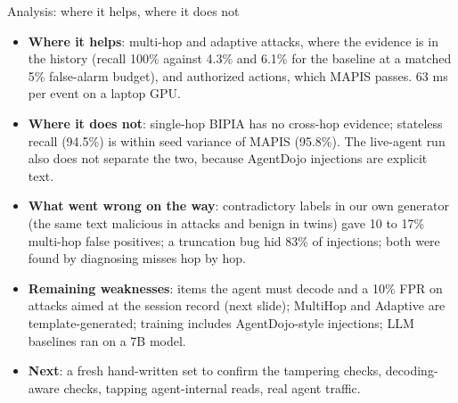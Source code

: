 \documentclass[aspectratio=169,10pt]{beamer}
\begin{document}
\begin{frame}{Analysis: where it helps, where it does not}
  \begin{itemize}\small
    \item \textbf{Where it helps}: multi-hop and adaptive attacks, where the evidence is in the history (recall 100\% against 4.3\% and 6.1\% for the baseline at a matched 5\% false-alarm budget), and authorized actions, which MAPIS passes. 63 ms per event on a laptop GPU.
    \item \textbf{Where it does not}: single-hop BIPIA has no cross-hop evidence; stateless recall (94.5\%) is within seed variance of MAPIS (95.8\%). The live-agent run also does not separate the two, because AgentDojo injections are explicit text.
    \item \textbf{What went wrong on the way}: contradictory labels in our own generator (the same text malicious in attacks and benign in twins) gave 10 to 17\% multi-hop false positives; a truncation bug hid 83\% of injections; both were found by diagnosing misses hop by hop.
    \item \textbf{Remaining weaknesses}: items the agent must decode and a 10\% FPR on attacks aimed at the session record (next slide); MultiHop and Adaptive are template-generated; training includes AgentDojo-style injections; LLM baselines ran on a 7B model.
    \item \textbf{Next}: a fresh hand-written set to confirm the tampering checks, decoding-aware checks, tapping agent-internal reads, real agent traffic.
  \end{itemize}
\end{frame}
\end{document}
